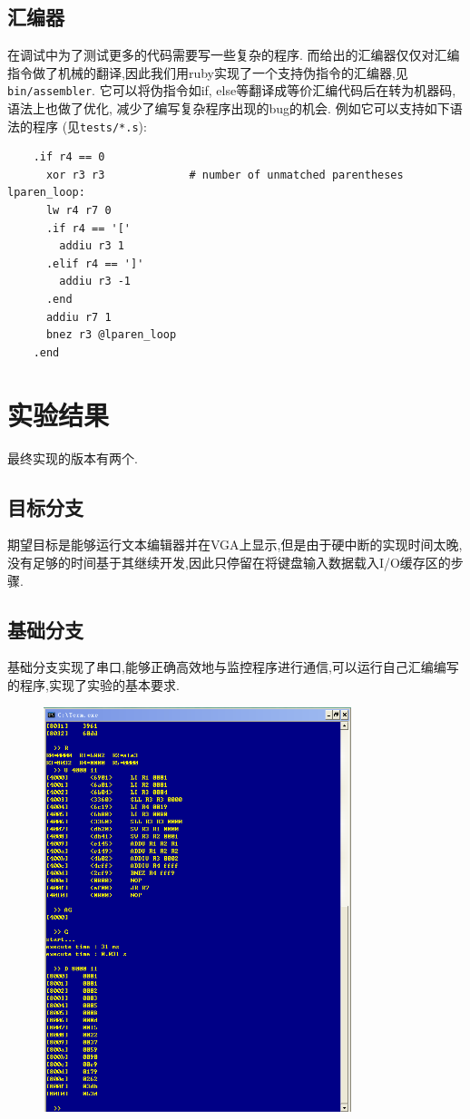 \subsection{汇编器}
在调试中为了测试更多的代码需要写一些复杂的程序.
而给出的汇编器仅仅对汇编指令做了机械的翻译,因此我们用ruby实现了一个支持伪指令的汇编器,见\verb|bin/assembler|.
它可以将伪指令如if, else等翻译成等价汇编代码后在转为机器码,语法上也做了优化, 减少了编写复杂程序出现的bug的机会. 例如它可以支持如下语法的程序
(见\verb|tests/*.s|):
\begin{lstlisting}
    .if r4 == 0
      xor r3 r3             # number of unmatched parentheses
lparen_loop:
      lw r4 r7 0
      .if r4 == '['
        addiu r3 1
      .elif r4 == ']'
        addiu r3 -1
      .end
      addiu r7 1
      bnez r3 @lparen_loop
    .end
\end{lstlisting}
\section{实验结果}
最终实现的版本有两个.
\subsection{目标分支}
期望目标是能够运行文本编辑器并在VGA上显示,但是由于硬中断的实现时间太晚,没有足够的时间基于其继续开发,因此只停留在将键盘输入数据载入I/O缓存区的步骤.
\subsection{基础分支}
基础分支实现了串口,能够正确高效地与监控程序进行通信,可以运行自己汇编编写的程序,实现了实验的基本要求.
\begin{figure}[H]
  \centering
  \includegraphics[width=0.8\textwidth]{figure/result.png}
\end{figure}



